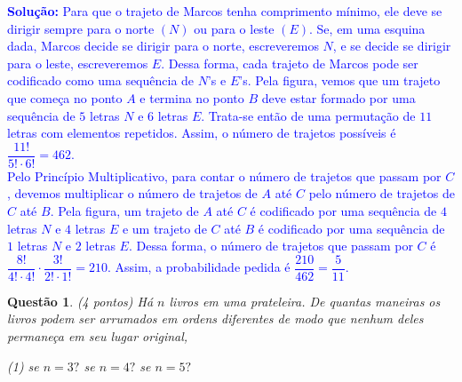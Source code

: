\documentclass[oneside,a4paper,12pt]{article}
\newcommand{\negrito}[1]{\mbox{\boldmath{$#1$}}}
\theoremstyle{Colorido}
\theoremstyle{solu}
\theoremstyle{dotlessP}
\newcommand{\solucao}[1]{\textcolor{blue}{\textbf{Solução:} #1}}
\newtheorem{sol}{Questão}
\begin{document}
\solucao{Para que o trajeto de Marcos tenha comprimento mínimo, ele deve se dirigir sempre para o norte $(N)$ ou para o leste $(E)$. Se, em uma esquina dada, Marcos decide se dirigir para o norte, escreveremos $N$, e se decide se dirigir para o leste, escreveremos $E$. Dessa forma, cada trajeto de Marcos pode ser codificado como uma sequência de $N$'s e $E$'s. Pela figura, vemos que um trajeto que começa no ponto $A$ e termina no ponto $B$ deve estar formado por uma sequência de $5$ letras $N$ e $6$ letras $E$. Trata-se então de uma permutação de $11$ letras com elementos repetidos. Assim, o número de trajetos possíveis é $\dfrac{11!}{5! \cdot 6!}=462$. \\ Pelo Princípio Multiplicativo, para contar o número de trajetos que passam por $C$, devemos multiplicar o número de trajetos de $A$ até $C$ pelo número de trajetos de $C$ até $B$. Pela figura, um trajeto de $A$ até $C$ é codificado por uma sequência de $4$ letras $N$ e $4$ letras $E$ e um trajeto de $C$ até $B$ é codificado por uma sequência de $1$ letras $N$ e $2$ letras $E$. Dessa forma, o número de trajetos que passam por $C$ é $\dfrac{8!}{4! \cdot 4!} \cdot \dfrac{3!}{2! \cdot 1!}=210$. Assim, a probabilidade pedida é $\dfrac{210}{462}=\dfrac{5}{11}$.}
\newpage
	\begin{sol}
\textit{(4 pontos)} \newline \newline
Há $n$ livros em uma prateleira. De quantas maneiras os livros podem ser arrumados em ordens diferentes de modo que nenhum deles permaneça em seu lugar original,
\begin{tasks}[counter-format={(tsk[a])},label-width=3.6ex, label-format = {\bfseries}, column-sep = {20pt}](1)
\task[\textcolor{blue}{$\negrito{(a)} $}] se $n = 3?$
\task[\textcolor{blue}{$\negrito{(b)} $}] se $n = 4?$
\task[\textcolor{blue}{$\negrito{(c)} $}] se $n = 5?$
\end{tasks}
\end{sol}
\end{document}
